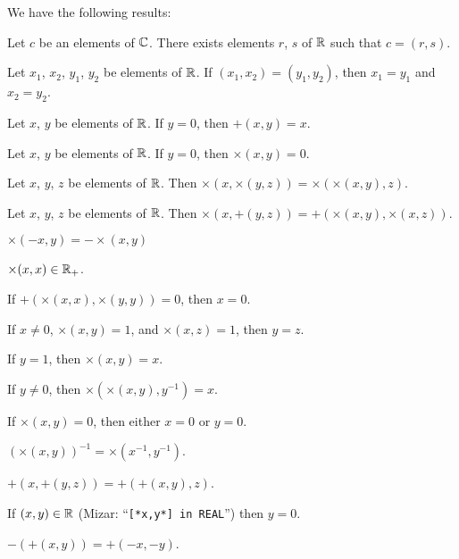 \documentclass{article}
\begin{document}
We have the following results:
\begin{thm}
\item\label{arytm0:9} Let $c$ be an elements of $\mathbb{C}$.
  There exists elements $r$, $s$ of $\mathbb{R}$ such that $c=(r,s)$.
\item\label{arytm0:10} Let $x_{1}$, $x_{2}$, $y_{1}$, $y_{2}$ be
  elements of $\mathbb{R}$. If $(x_{1},x_{2})=(y_{1},y_{2})$, then
  $x_{1}=y_{1}$ and $x_{2}=y_{2}$.
\item\label{arytm0:11} Let $x$, $y$ be elements of $\mathbb{R}$. If $y=0$, then $+(x,y)=x$.
\item\label{arytm0:12} Let $x$, $y$ be elements of $\mathbb{R}$. If $y=0$, then $\times(x,y)=0$.
\item\label{arytm0:13} Let $x$, $y$, $z$ be elements of $\mathbb{R}$.
  Then $\times(x,\times(y,z))=\times(\times(x,y),z)$.
\item\label{arytm0:14} Let $x$, $y$, $z$ be elements of $\mathbb{R}$.
  Then $\times(x,+(y,z))=+(\times(x,y),\times(x,z))$.
\item\label{arytm0:15} $\times(-x,y)=-\times(x,y)$
\item\label{arytm0:16} $\times(x,x)\in\mathbb{R}_{+}$.
\item\label{arytm0:17} If $+(\times(x,x),\times(y,y))=0$, then $x=0$.
\item\label{arytm0:18} If $x\neq0$, $\times(x,y)=1$, and
  $\times(x,z)=1$, then $y=z$.
\item\label{arytm0:19} If $y=1$, then $\times(x,y)=x$.
\item\label{arytm0:20} If $y\neq0$, then $\times(\times(x,y),y^{-1})=x$.
\item\label{arytm0:21} If $\times(x,y)=0$, then either $x=0$ or $y=0$.
\item\label{arytm0:22} $(\times(x,y))^{-1}=\times(x^{-1},y^{-1})$.
\item\label{arytm0:23} $+(x,+(y,z))=+(+(x,y),z)$.
\item\label{arytm0:24} If $(x,y)\in\mathbb{R}$ (Mizar: ``\verb#[*x,y*] in REAL#'')
  then $y=0$.
\item\label{arytm0:25} $-(+(x,y))=+(-x,-y)$.
\end{thm}
\end{document}
